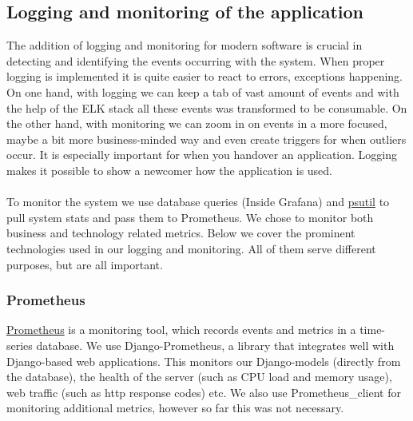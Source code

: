 \documentclass[12pt]{article}
\begin{document}
\subsection{Logging and monitoring of the application}
The addition of logging and monitoring for modern software is crucial in detecting and identifying the events occurring with the system. When proper logging is implemented it is quite easier to react to errors, exceptions happening. On one hand, with logging we can keep a tab of vast amount of events and with the help of the ELK stack all these events was transformed to be consumable. On the other hand, with monitoring we can zoom in on events in a more focused, maybe a bit more business-minded way and even create triggers for when outliers occur. It is especially important for when you handover an application. Logging makes it possible to show a newcomer how the application is used.
\\\\
To monitor the system we use database queries (Inside Grafana) and \href{https://github.com/giampaolo/psutil}{psutil} to pull system stats and pass them to Prometheus. We chose to monitor both business and technology related metrics. Below we cover the prominent technologies used in our logging and monitoring. All of them serve different purposes, but are all important.
\subsubsection{Prometheus}
\href{https://Prometheus.io/}{Prometheus} is a monitoring tool, which records events and metrics in a time-series database. We use Django-Prometheus, a library that integrates well with Django-based web applications. This monitors our Django-models (directly from the database), the health of the server (such as CPU load and memory usage), web traffic (such as http response codes) etc. We also use Prometheus\_client for monitoring additional metrics, however so far this was not necessary. 
\end{document}
